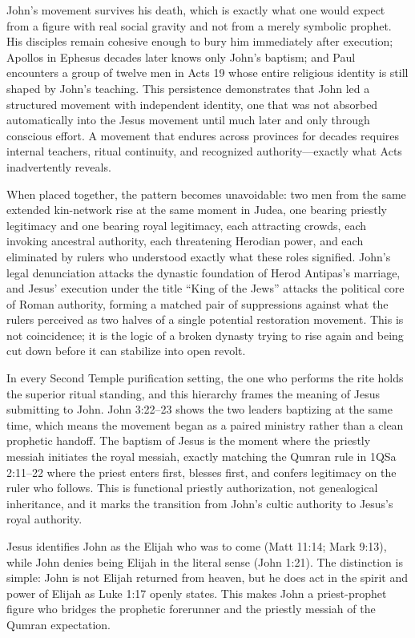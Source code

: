 John's movement survives his death, which is exactly what one would expect from a figure with real social gravity and not from a merely symbolic prophet.
His disciples remain cohesive enough to bury him immediately after execution; Apollos in Ephesus decades later knows only John's baptism; and Paul encounters a group of twelve men in Acts 19 whose entire religious identity is still shaped by John's teaching.
This persistence demonstrates that John led a structured movement with independent identity, one that was not absorbed automatically into the Jesus movement until much later and only through conscious effort.
A movement that endures across provinces for decades requires internal teachers, ritual continuity, and recognized authority---exactly what Acts inadvertently reveals.

When placed together, the pattern becomes unavoidable: two men from the same extended kin-network rise at the same moment in Judea, one bearing priestly legitimacy and one bearing royal legitimacy, each attracting crowds, each invoking ancestral authority, each threatening Herodian power, and each eliminated by rulers who understood exactly what these roles signified.
John's legal denunciation attacks the dynastic foundation of Herod Antipas's marriage, and Jesus' execution under the title ``King of the Jews'' attacks the political core of Roman authority, forming a matched pair of suppressions against what the rulers perceived as two halves of a single potential restoration movement.
This is not coincidence; it is the logic of a broken dynasty trying to rise again and being cut down before it can stabilize into open revolt.

In every Second Temple purification setting, the one who performs the rite holds the superior ritual standing, and this hierarchy frames the meaning of Jesus submitting to John.
John 3:22--23 shows the two leaders baptizing at the same time, which means the movement began as a paired ministry rather than a clean prophetic handoff.
The baptism of Jesus is the moment where the priestly messiah initiates the royal messiah, exactly matching the Qumran rule in 1QSa 2:11--22 where the priest enters first, blesses first, and confers legitimacy on the ruler who follows.
This is functional priestly authorization, not genealogical inheritance, and it marks the transition from John's cultic authority to Jesus's royal authority.

Jesus identifies John as the Elijah who was to come (Matt 11:14; Mark 9:13), while John denies being Elijah in the literal sense (John 1:21).
The distinction is simple: John is not Elijah returned from heaven, but he does act in the spirit and power of Elijah as Luke 1:17 openly states.
This makes John a priest-prophet figure who bridges the prophetic forerunner and the priestly messiah of the Qumran expectation.

